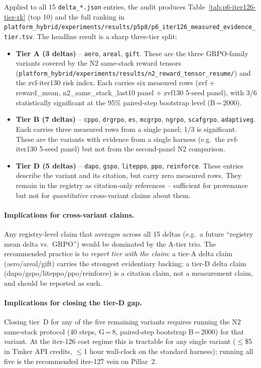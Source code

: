 Applied to all 15 \texttt{delta\_*.json} entries, the audit produces
Table~\ref{tab:p6-iter126-tier-rk} (top 10) and the full ranking in
\texttt{platform_hybrid/experiments/results/p5p8/p6\_iter126\_measured\_evidence\_tier.tsv}.
The headline result is a sharp three-tier split:
\begin{itemize}
\item \textbf{Tier A (3 deltas)} -- \texttt{aero}, \texttt{areal}, \texttt{gift}.
These are the three GRPO-family variants covered by the N2
same-stack reward tensors
(\texttt{platform_hybrid/experiments/results/n2\_reward\_tensor\_resume/}) and the
zvf-iter130 risk index.  Each carries six measured rows (zvf +
reward\_mean, n2\_same\_stack\_last10 panel + zvf130 5-seed panel), with
3/6 statistically significant at the 95\% paired-step bootstrap level
(B\,=\,2000).
\item \textbf{Tier B (7 deltas)} -- \texttt{cppo}, \texttt{drgrpo}, \texttt{es},
\texttt{mcgrpo}, \texttt{ngrpo}, \texttt{scafgrpo}, \texttt{adaptiveg}.
Each carries three measured rows from a single panel; 1/3 is significant.
These are the variants with evidence from a single harness
(e.g.\ the zvf-iter130 5-seed panel) but not from the second-panel N2
comparison.
\item \textbf{Tier D (5 deltas)} -- \texttt{dapo}, \texttt{gspo}, \texttt{liteppo},
\texttt{ppo}, \texttt{reinforce}.  These entries describe the variant and
its citation, but carry zero measured rows.  They remain in the registry
as citation-only references -- sufficient for provenance but not for
\emph{quantitative} cross-variant claims about them.
\end{itemize}

\paragraph{Implications for cross-variant claims.}
Any registry-level claim that averages across all 15 deltas
(e.g.\ a future ``registry mean delta vs.\ GRPO'') would be dominated by
the A-tier trio.  The recommended practice is to \emph{report tier with
the claim}: a tier-A delta claim (aero/areal/gift) carries the strongest
evidentiary backing; a tier-D delta claim (dapo/gspo/liteppo/ppo/reinforce)
is a citation claim, not a measurement claim, and should be reported as
such.

\paragraph{Implications for closing the tier-D gap.}
Closing tier~D for any of the five remaining variants requires running
the N2 same-stack protocol (40 steps, G\,=\,8, paired-step bootstrap B\,=\,2000)
for that variant.  At the iter-126 cost regime this is tractable for any
single variant ($\leq$\$5 in Tinker API credits, $\leq$1 hour wall-clock on
the standard harness); running all five is the recommended iter-127 vein
on Pillar~2.

